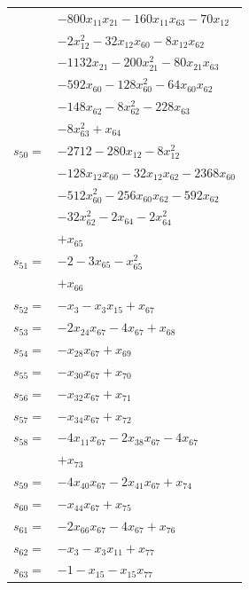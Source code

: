 \begin{longtable}{@{}r@{\;}l@{}}
 & \(\displaystyle -800x_{11}x_{21} -160x_{11}x_{63} -70x_{12}\) \\
 & \(\displaystyle -2x_{12}^{2} -32x_{12}x_{60} -8x_{12}x_{62}\) \\
 & \(\displaystyle -1132x_{21} -200x_{21}^{2} -80x_{21}x_{63}\) \\
 & \(\displaystyle -592x_{60} -128x_{60}^{2} -64x_{60}x_{62}\) \\
 & \(\displaystyle -148x_{62} -8x_{62}^{2} -228x_{63}\) \\
 & \(\displaystyle -8x_{63}^{2} +x_{64}\) \\[3pt]
\(s_{50}=\) & \(\displaystyle -2712 -280x_{12} -8x_{12}^{2}\) \\
 & \(\displaystyle -128x_{12}x_{60} -32x_{12}x_{62} -2368x_{60}\) \\
 & \(\displaystyle -512x_{60}^{2} -256x_{60}x_{62} -592x_{62}\) \\
 & \(\displaystyle -32x_{62}^{2} -2x_{64} -2x_{64}^{2}\) \\
 & \(\displaystyle +x_{65}\) \\[3pt]
\(s_{51}=\) & \(\displaystyle -2 -3x_{65} -x_{65}^{2}\) \\
 & \(\displaystyle +x_{66}\) \\[3pt]
\(s_{52}=\) & \(\displaystyle -x_{3} -x_{3}x_{15} +x_{67}\) \\[3pt]
\(s_{53}=\) & \(\displaystyle -2x_{24}x_{67} -4x_{67} +x_{68}\) \\[3pt]
\(s_{54}=\) & \(\displaystyle -x_{28}x_{67} +x_{69}\) \\[3pt]
\(s_{55}=\) & \(\displaystyle -x_{30}x_{67} +x_{70}\) \\[3pt]
\(s_{56}=\) & \(\displaystyle -x_{32}x_{67} +x_{71}\) \\[3pt]
\(s_{57}=\) & \(\displaystyle -x_{34}x_{67} +x_{72}\) \\[3pt]
\(s_{58}=\) & \(\displaystyle -4x_{11}x_{67} -2x_{38}x_{67} -4x_{67}\) \\
 & \(\displaystyle +x_{73}\) \\[3pt]
\(s_{59}=\) & \(\displaystyle -4x_{40}x_{67} -2x_{41}x_{67} +x_{74}\) \\[3pt]
\(s_{60}=\) & \(\displaystyle -x_{44}x_{67} +x_{75}\) \\[3pt]
\(s_{61}=\) & \(\displaystyle -2x_{66}x_{67} -4x_{67} +x_{76}\) \\[3pt]
\(s_{62}=\) & \(\displaystyle -x_{3} -x_{3}x_{11} +x_{77}\) \\[3pt]
\(s_{63}=\) & \(\displaystyle -1 -x_{15} -x_{15}x_{77}\) \\

\end{longtable}
